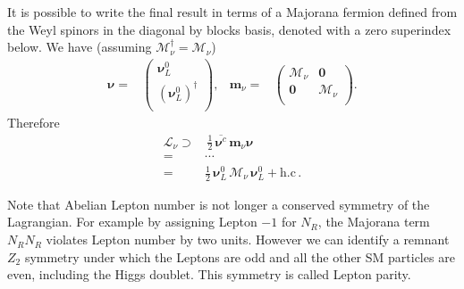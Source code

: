 It is possible to write the final result in terms of a Majorana fermion defined from the Weyl spinors in the diagonal by blocks basis, denoted with a zero superindex below. We have (assuming
$\boldsymbol{\mathcal{M}}_{\nu}^{\dagger}=\boldsymbol{\mathcal{M}}_{\nu}$)
\begin{align}
  \boldsymbol{\nu}=&
  \begin{pmatrix}
    \boldsymbol{\nu}_L^0\\
    \left( \boldsymbol{\nu}_L^0 \right)^{\dagger}\\
  \end{pmatrix},&       \boldsymbol{m}_{\nu}=& \begin{pmatrix}
                                      \boldsymbol{\mathcal{M}}_{\nu} & \boldsymbol{0} \\
                                      \boldsymbol{0} & \boldsymbol{\mathcal{M}}_{\nu}  \\
                                    \end{pmatrix}.
\end{align}
Therefore
\begin{align}
  \mathcal{L}_{\nu}\supset &\, \tfrac{1}{2}\,\overline{\boldsymbol{\nu}^c}\, \boldsymbol{m}_{\nu} \boldsymbol{\nu}   \nonumber\\
=& \cdots \nonumber\\
=&\tfrac{1}{2}\,\boldsymbol{\nu}_L^{0}\, \boldsymbol{\mathcal{M}}_{\nu}\,   \boldsymbol{\nu}_L^{0} +\text{h.c}\,.
\end{align}

Note that Abelian Lepton number is not longer a conserved symmetry of the Lagrangian. For example by assigning Lepton $-1$ for $N_R$, the Majorana term $N_R N_R$ violates Lepton number by two units. However we can identify a remnant $Z_{2}$ symmetry under which the Leptons are odd and all the other SM particles are even, including the Higgs doublet. This symmetry is called Lepton parity.

